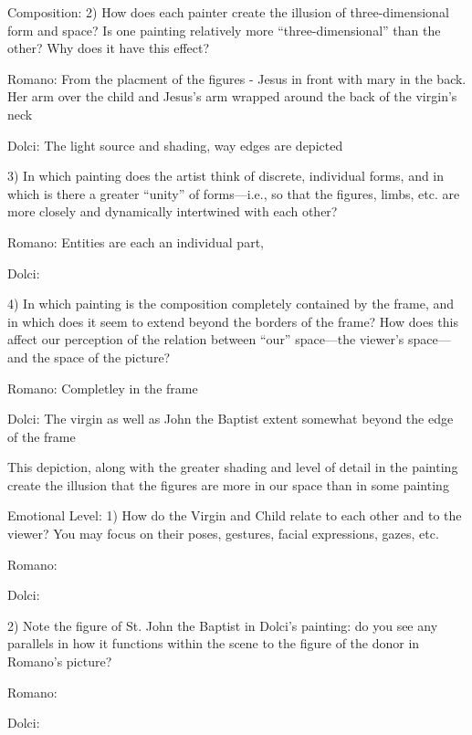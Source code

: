 Composition:
    2)  How does each painter create the illusion of three-dimensional form and
        space?  Is one painting relatively more “three-dimensional” than the
        other? Why does it have this effect?

        Romano:
            From the placment of the figures - Jesus in front with mary in the
            back.  Her arm over the child and Jesus's arm wrapped around the
            back of the virgin's neck

        Dolci:
            The light source and shading, way edges are depicted


    3)  In which painting does the artist think of discrete, individual forms,
        and in which is there a greater “unity” of forms—i.e., so that the
        figures, limbs, etc. are more closely and dynamically intertwined with
        each other?

        Romano:
            Entities are each an individual part, 

        Dolci:


    4)  In which painting is the composition completely contained by the frame,
        and in which does it seem to extend beyond the borders of the frame?
        How does this affect our perception of the relation between “our”
        space—the viewer’s space—and the space of the picture?

        Romano:
            Completley in the frame

        Dolci:
            The virgin as well as John the Baptist extent somewhat beyond the
            edge of the frame

            This depiction, along with the greater shading and level of detail
            in the painting create the illusion that the figures are more in
            our space than in some painting


Emotional Level:
    1)  How do the Virgin and Child relate to each other and to the viewer?
        You may focus on their poses, gestures, facial expressions, gazes, etc.

        Romano:

        Dolci:


    2)  Note the figure of St. John the Baptist in Dolci’s painting:  do you
        see any parallels in how it functions within the scene to the figure of
        the donor in Romano’s picture?

        Romano:

        Dolci:


